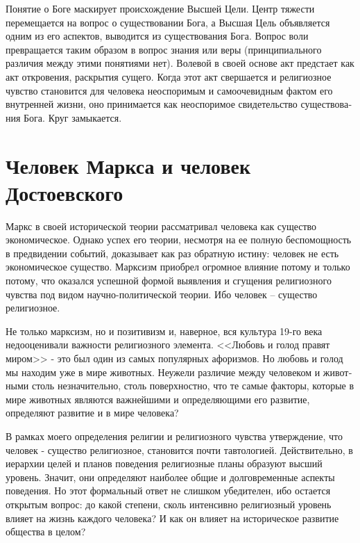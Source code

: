 \documentclass{book}
\begin{document}
Понятие о Боге маскирует происхождение Высшей Цели. Центр тяжести перемещается на вопрос о существовании  Бога, а Высшая Цель объявляется одним из его аспектов, выводится из существования Бога. Вопрос воли  превращается таким обра­зом в вопрос знания  или веры  (принципиального различия между этими понятиями нет). Волевой в своей основе акт предстает как акт откровения, раскрытия сущего. Когда этот акт свершается и религиозное чувство становится для человека неоспоримым и самоочевидным фактом его внутренней жизни, оно принимается как неоспоримое свидетельство существова­ния Бога. Круг замыкается. 


\section{Человек Маркса и человек Достоевского}

Маркс в своей исторической теории рассматривал человека как существо экономическое.  Однако успех его теории, несмот­ря на ее полную беспомощность в предвидении событий, дока­зывает как раз обратную истину: человек не есть экономиче­ское существо. Марксизм приобрел огромное влияние потому и только потому, что оказался успешной формой выявления и сгущения религиозного чувства под видом научно-политической теории. Ибо человек -- существо религиозное.

Не только марксизм, но и позитивизм и, наверное, вся куль­тура 19-го века недооценивали важности религиозного элемен­та. <<Любовь и голод правят миром>> - это был один из самых популярных афоризмов. Но любовь и голод мы находим уже в мире животных. Неужели различие между человеком и живот­ными столь незначительно, столь поверхностно, что те самые факторы, которые в мире животных являются важнейшими и определяющими его развитие, определяют развитие и в мире человека?

В рамках моего определения религии и религиозного чувст­ва утверждение, что человек - существо религиозное, становит­ся почти тавтологией. Действительно, в иерархии целей и планов поведения религиозные планы образуют высший уровень. Зна­чит, они определяют наиболее общие и долговременные аспек­ты поведения. Но этот формальный ответ не слишком убеди­телен, ибо остается открытым вопрос: до какой степени, сколь интенсивно религиозный уровень влияет на жизнь каждого человека? И как он влияет на историческое развитие общест­ва в целом?
\end{document}
